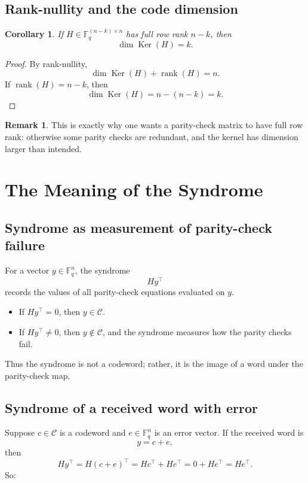 \documentclass[11pt]{article}
\newcommand{\F}{\mathbb{F}}
\newcommand{\rank}{\operatorname{rank}}
\newcommand{\Ker}{\operatorname{Ker}}
\newcommand{\cC}{\mathcal{C}}
\theoremstyle{definition}
\newtheorem{remark}[definition]{Remark}
\theoremstyle{plain}
\newtheorem{corollary}[definition]{Corollary}
\begin{document}
	\subsection{Rank-nullity and the code dimension}
	
	\begin{corollary}
		If \(H\in \F_q^{(n-k)\times n}\) has full row rank \(n-k\), then
		\[
		\dim \Ker(H)=k.
		\]
	\end{corollary}
	
	\begin{proof}
		By rank-nullity,
		\[
		\dim\Ker(H)+\rank(H)=n.
		\]
		If \(\rank(H)=n-k\), then
		\[
		\dim\Ker(H)=n-(n-k)=k.
		\]
	\end{proof}
	
	\begin{remark}
		This is exactly why one wants a parity-check matrix to have full row rank: otherwise some parity checks are redundant, and the kernel has dimension larger than intended.
	\end{remark}
	
	\section{The Meaning of the Syndrome}
	
	\subsection{Syndrome as measurement of parity-check failure}
	
	For a vector \(y\in \F_q^n\), the syndrome
	\[
	Hy^\top
	\]
	records the values of all parity-check equations evaluated on \(y\).
	
	\begin{itemize}[leftmargin=2em]
		\item If \(Hy^\top=0\), then \(y\in \cC\).
		\item If \(Hy^\top\neq 0\), then \(y\notin \cC\), and the syndrome measures how the parity checks fail.
	\end{itemize}
	
	Thus the syndrome is not a codeword; rather, it is the image of a word under the parity-check map.
	
	\subsection{Syndrome of a received word with error}
	
	Suppose \(c\in \cC\) is a codeword and \(e\in \F_q^n\) is an error vector. If the received word is
	\[
	y=c+e,
	\]
	then
	\[
	Hy^\top = H(c+e)^\top = Hc^\top + He^\top = 0 + He^\top = He^\top.
	\]
	So:
	
\end{document}
